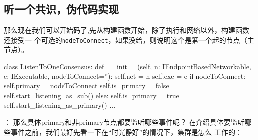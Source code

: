 \documentclass[dvipsnames]{ctexart}
\newcommand{\mycola}{MidnightBlue}
\newcommand{\mycolb}{Mahogany}
\newcommand{\cola}[1]{\textcolor{\mycola}{#1}}
\newcommand{\colb}[1]{\textcolor{\mycolb}{#1}}
\begin{document}
\subsection{\textbf{听一个共识}，伪代码实现}
那么现在我们可以开始码了,先从构建函数开始，除了执行和网络以外，构建函数还接受一
个可选的\texttt{nodeToConnect}，如果没给，则说明这个是第一个起的节点（主节点）。
\begin{simplepy}
class ListenToOneConsensus:
    def __init__(self,
                 n: IEndpointBasedNetworkable,
                 e: IExecutable,
                 nodeToConnect=''):
        self.net = n
        self.exe = e
        if nodeToConnect:
            self.primary = nodeToConnect
            self.is_primary = false
            self.start_listening_as_sub()
        else:
            self.is_primary = true
            self.start_listening_as_primary()
    ...
\end{simplepy}
 ： 那么具体primary和非primary节点都要监听哪些事件呢？
在介绍具体要监听哪些事件之前，我们最好先看一下在“时光静好”的情况下，集群是怎么
工作的：
\begin{center}
\end{center}
\end{document}
